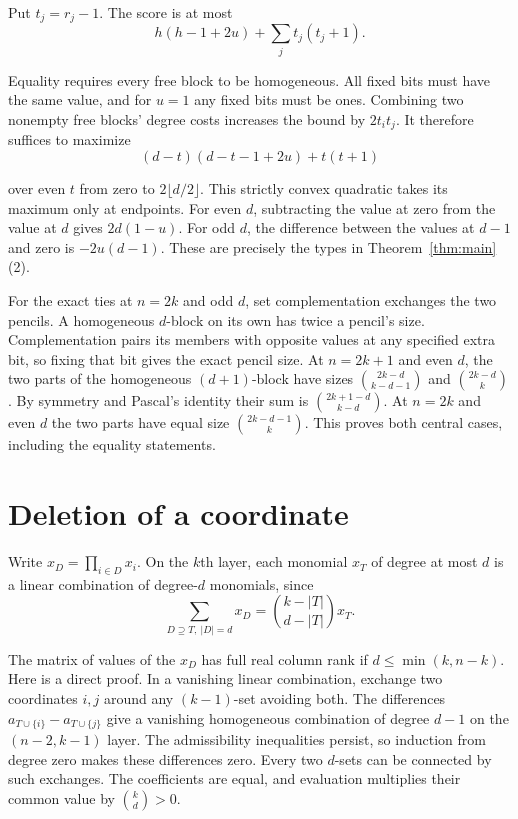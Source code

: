 \documentclass[11pt,letterpaper]{article}
\numberwithin{equation}{section}
\begin{document}
Put $t_j=r_j-1$. The score is at most
\[
h(h-1+2u)+\sum_j t_j(t_j+1).
\]

Equality requires every free block to be homogeneous. All fixed bits must have the same value,
and for $u=1$ any fixed bits must be ones. Combining two nonempty free blocks' degree costs
increases the bound by $2t_it_j$. It therefore suffices to maximize
\[
(d-t)(d-t-1+2u)+t(t+1)
\]

over even $t$ from zero to $2\lfloor d/2\rfloor$. This strictly convex quadratic takes its
maximum only at endpoints. For even $d$, subtracting the value at zero from the value at $d$
gives $2d(1-u)$. For odd $d$, the difference between the values at $d-1$ and zero is
$-2u(d-1)$. These are precisely the types in Theorem~\ref{thm:main}(2).

For the exact ties at $n=2k$ and odd $d$, set complementation exchanges the two pencils. A
homogeneous $d$-block on its own has twice a pencil's size. Complementation pairs its members
with opposite values at any specified extra bit, so fixing that bit gives the exact pencil
size. At $n=2k+1$ and even $d$, the two parts of the homogeneous $(d+1)$-block have sizes
$\binom{2k-d}{k-d-1}$ and $\binom{2k-d}{k}$. By symmetry and Pascal's identity their sum is
$\binom{2k+1-d}{k-d}$. At $n=2k$ and even $d$ the two parts have equal size
$\binom{2k-d-1}{k}$. This proves both central cases, including the equality statements.

\section{Deletion of a coordinate}\label{sec:delete}

Write $x_D=\prod_{i\in D}x_i$. On the $k$th layer, each monomial $x_T$ of degree at most $d$
is a linear combination of degree-$d$ monomials, since
\[
\sum_{D\supseteq T,\ |D|=d}x_D=\binom{k-|T|}{d-|T|}x_T .
\]

The matrix of values of the $x_D$ has full real column rank if $d\le\min(k,n-k)$. Here is a
direct proof. In a vanishing linear combination, exchange two coordinates $i,j$ around any
$(k-1)$-set avoiding both. The differences $a_{T\cup\{i\}}-a_{T\cup\{j\}}$ give a vanishing
homogeneous combination of degree $d-1$ on the $(n-2,k-1)$ layer. The admissibility
inequalities persist, so induction from degree zero makes these differences zero. Every two
$d$-sets can be connected by such exchanges. The coefficients are equal, and evaluation
multiplies their common value by $\binom{k}{d}>0$.
\end{document}
